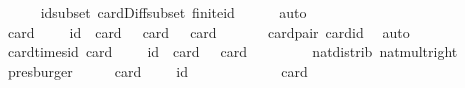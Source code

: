\begin{isabellebody}
\ \ \ \ \isamarkupfalse%
\ id{\isacharunderscore}{\kern0pt}subset\ card{\isacharunderscore}{\kern0pt}Diff{\isacharunderscore}{\kern0pt}subset\ finite{\isacharunderscore}{\kern0pt}id\isanewline
\ \ \ \ \isamarkupfalse%
\ auto\isanewline
\ \ \isamarkupfalse%
\ \isamarkupfalse%
\ {\isachardoublequoteopen}card\ {\isacharparenleft}{\kern0pt}{\isacharparenleft}{\kern0pt}{\isasymK}\ {\isasymtimes}\ {\isasymK}{\isacharparenright}{\kern0pt}\ {\isacharminus}{\kern0pt}\ {\isacharquery}{\kern0pt}id{\isacharparenright}{\kern0pt}\ {\isacharequal}{\kern0pt}\ card\ {\isasymK}\ {\isacharasterisk}{\kern0pt}\ card\ {\isasymK}\ {\isacharminus}{\kern0pt}\ card\ {\isasymK}{\isachardoublequoteclose}\isanewline
\ \ \ \ \isamarkupfalse%
\ card{\isacharunderscore}{\kern0pt}{\isasymK}{\isacharunderscore}{\kern0pt}pair\ card{\isacharunderscore}{\kern0pt}id\ \isamarkupfalse%
\ auto\isanewline
\ \ \isamarkupfalse%
\ \isamarkupfalse%
\ card{\isacharunderscore}{\kern0pt}times{\isacharunderscore}{\kern0pt}id{\isacharcolon}{\kern0pt}\ {\isachardoublequoteopen}card\ {\isacharparenleft}{\kern0pt}{\isacharparenleft}{\kern0pt}{\isasymK}\ {\isasymtimes}\ {\isasymK}{\isacharparenright}{\kern0pt}\ {\isacharminus}{\kern0pt}\ {\isacharquery}{\kern0pt}id{\isacharparenright}{\kern0pt}\ {\isacharequal}{\kern0pt}\ card\ {\isasymK}\ {\isacharasterisk}{\kern0pt}\ {\isacharparenleft}{\kern0pt}card\ {\isasymK}\ {\isacharminus}{\kern0pt}\ {}{\isacharparenright}{\kern0pt}{\isachardoublequoteclose}\isanewline
\ \ \ \ \isamarkupfalse%
\ nat{\isacharunderscore}{\kern0pt}distrib{\isacharparenleft}{\kern0pt}{}{\isacharparenright}{\kern0pt}\ nat{\isacharunderscore}{\kern0pt}mult{\isacharunderscore}{\kern0pt}{}{\isacharunderscore}{\kern0pt}right\ \isamarkupfalse%
\ presburger\isanewline
\ \ \isamarkupfalse%
\ \isamarkupfalse%
\ {\isachardoublequoteopen}card\ {\isacharparenleft}{\kern0pt}{\isacharparenleft}{\kern0pt}{\isasymK}\ {\isasymtimes}\ {\isasymK}{\isacharparenright}{\kern0pt}\ {\isacharminus}{\kern0pt}\ {\isacharquery}{\kern0pt}id{\isacharparenright}{\kern0pt}\ {\isasymge}\ {}\ {\isacharasterisk}{\kern0pt}\ {\isacharparenleft}{\kern0pt}{}\ {\isacharminus}{\kern0pt}\ {}{\isacharparenright}{\kern0pt}{\isachardoublequoteclose}\ \isanewline
\ \ \ \ \isamarkupfalse%
\ card{\isacharunderscore}{\kern0pt}{\isasymK}\isanewline
\ \ \ \ \isamarkupfalse%

\end{isabellebody}
